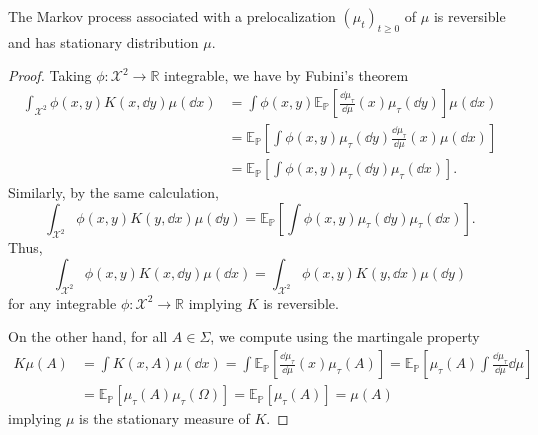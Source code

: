 \begin{proposition}
  The Markov process associated with a prelocalization \((\mu_t)_{t \ge 0}\) of \(\mu\) is reversible and 
  has stationary distribution \(\mu\). 
\end{proposition}
\begin{proof}
  Taking \(\phi : \mathcal{X}^2 \to \mathbb{R}\) integrable, we have by Fubini's theorem
  \begin{equation}\label{eq:markov_assoc}
    \begin{split}
      \int_{\mathcal{X}^2} \phi(x, y) K(x, \dd y) \mu(\dd x) & = 
      \int \phi(x, y) \mathbb{E}_\mathbb{P}\left[\frac{\dd \mu_\tau}{\dd \mu}(x) \mu_\tau(\dd y)\right]\mu(\dd x)\\
      & = \mathbb{E}_\mathbb{P}\left[\int \phi(x, y) \mu_\tau(\dd y) \frac{\dd \mu_\tau}{\dd \mu}(x) \mu(\dd x)\right]\\
      & = \mathbb{E}_\mathbb{P}\left[\int \phi(x, y) \mu_\tau(\dd y) \mu_\tau(\dd x)\right].
    \end{split}
  \end{equation}
  Similarly, by the same calculation,   
  \[\int_{\mathcal{X}^2} \phi(x, y) K(y, \dd x) \mu(\dd y) = \mathbb{E}_\mathbb{P}\left[\int \phi(x, y) \mu_\tau(\dd y) \mu_\tau(\dd x)\right].\]
  Thus, 
  \[\int_{\mathcal{X}^2} \phi(x, y) K(x, \dd y) \mu(\dd x) = \int_{\mathcal{X}^2} \phi(x, y) K(y, \dd x) \mu(\dd y)\]
  for any integrable \(\phi : \mathcal{X}^2 \to \mathbb{R}\) implying \(K\) is reversible.

  On the other hand, for all \(A \in \Sigma\), we compute using the martingale property
  \begin{align*} 
    K\mu(A) & = \int K(x, A) \mu(\dd x) = \int \mathbb{E}_\mathbb{P}\left[\frac{\dd \mu_\tau}{\dd \mu}(x) \mu_\tau(A)\right] 
    = \mathbb{E}_\mathbb{P}\left[\mu_\tau(A) \int \frac{\dd \mu_\tau}{\dd \mu} \dd \mu\right] \\
    & = \mathbb{E}_\mathbb{P}[\mu_\tau(A) \mu_\tau(\Omega)] = \mathbb{E}_\mathbb{P}[\mu_\tau(A)] = \mu(A)
  \end{align*}
  implying \(\mu\) is the stationary measure of \(K\).
\end{proof}

